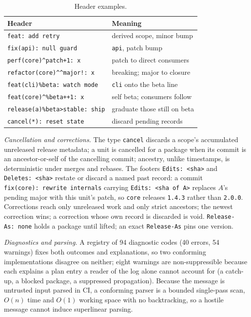 \documentclass[sigconf,nonacm]{acmart}
\newcommand{\code}[1]{\texttt{#1}}
\begin{document}
\begin{table}[t]
\caption{Header examples.}
\label{tab:headers}
\small
\begin{tabular}{@{}ll@{}}
\toprule
Header & Meaning \\
\midrule
\code{feat: add retry} & derived scope, minor bump \\
\code{fix(api): null guard} & \code{api}, patch bump \\
\code{perf(core)\^{}patch+1: x} & patch to direct consumers \\
\code{refactor(core)\^{}\^{}major!: x} & breaking; major to closure \\
\code{feat(cli)\%beta: watch mode} & \code{cli} onto the beta line \\
\code{feat(core)\^{}\%beta++1: x} & self beta; consumers follow \\
\code{release(a)\%beta>stable: ship} & graduate those still on beta \\
\code{cancel(*): reset state} & discard pending records \\
\bottomrule
\end{tabular}
\end{table}

\emph{Cancellation and corrections.} The type \code{cancel} discards a
scope's accumulated unreleased release metadata; a unit is cancelled for
a package when its commit is an ancestor-or-self of the cancelling
commit; ancestry, unlike timestamps, is deterministic under merges and
rebases. The footers \code{Edits:~<sha>} and \code{Deletes:~<sha>}
restate or discard a named past record: a commit
\code{fix(core):~rewrite internals} carrying \code{Edits:~<sha of A>}
replaces $A$'s pending major with this unit's patch, so \code{core}
releases \code{1.4.3} rather than \code{2.0.0}. Corrections reach only
unreleased work and only strict ancestors; the newest correction wins; a
correction whose own record is discarded is void.
\code{Release-As:~none} holds a package until lifted; an exact
\code{Release-As} pins one version.

\emph{Diagnostics and parsing.} A registry of 94 diagnostic codes (40
errors, 54 warnings) fixes both outcomes and explanations, so two
conforming implementations disagree on neither; eight warnings are
non-suppressible because each explains a plan entry a reader of the log
alone cannot account for (a catch-up, a blocked package, a suppressed
propagation). Because the message is untrusted input parsed in CI, a
conforming parser is a bounded single-pass scan, $O(n)$ time and $O(1)$
working space with no backtracking, so a hostile message cannot induce
superlinear parsing.
\end{document}
